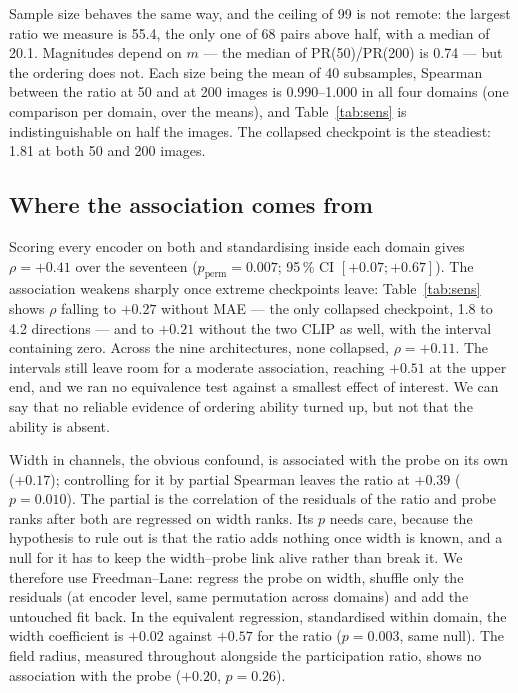 \documentclass{esannV2}
\begin{document}
Sample size behaves the same way, and the ceiling of 99 is not remote: the
largest ratio we measure is 55.4, the only one of 68 pairs above half, with a
median of 20.1. Magnitudes depend on $m$ --- the median of PR(50)/PR(200) is
0.74 --- but the ordering does not. Each size being the mean of 40 subsamples,
Spearman between the ratio at 50 and at 200 images is 0.990--1.000 in all four
domains (one comparison per domain, over the means), and
Table~\ref{tab:sens} is indistinguishable on half the images. The collapsed
checkpoint is the steadiest: 1.81 at both 50 and 200 images.

\subsection{Where the association comes from}

Scoring every encoder on both and standardising inside each domain gives
$\rho = +0.41$ over the seventeen ($p_{\text{perm}} = 0.007$; 95\,\%
CI $[+0.07; +0.67]$). The association weakens sharply once extreme checkpoints
leave: Table~\ref{tab:sens} shows $\rho$ falling to
$+0.27$ without MAE --- the only collapsed checkpoint, 1.8 to 4.2 directions
--- and to $+0.21$ without the two CLIP as well, with the interval containing
zero. Across the nine architectures, none collapsed, $\rho = +0.11$. The
intervals still leave room for a moderate association, reaching $+0.51$ at the
upper end, and we ran no equivalence test against a smallest effect of
interest. We can say that no reliable evidence of ordering ability
turned up, but not that the ability is absent.

Width in channels, the obvious confound, is associated with the probe on its
own ($+0.17$); controlling for it by partial Spearman leaves the ratio at
$+0.39$ ($p = 0.010$). The partial is the correlation of the residuals of the
ratio and probe ranks after both are regressed on width ranks. Its $p$ needs
care, because the hypothesis to rule out is that the ratio adds nothing once
width is known, and a null for it has to keep the width--probe link alive
rather than break it. We therefore use Freedman--Lane: regress the probe on
width, shuffle only the residuals (at encoder level, same permutation across
domains) and add the untouched fit back. In the
equivalent regression, standardised within domain, the width coefficient is
$+0.02$ against $+0.57$ for the ratio ($p = 0.003$, same null). The field
radius, measured throughout alongside the participation ratio, shows no
association with the probe ($+0.20$, $p = 0.26$).
\end{document}
